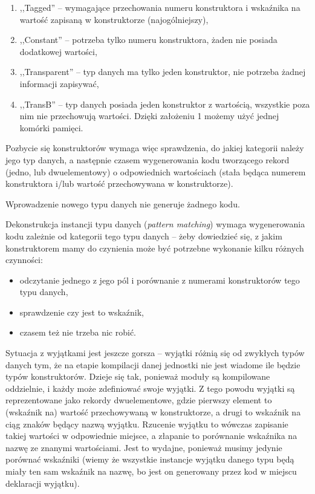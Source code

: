 \documentclass[11pt]{scrartcl}
\begin{document}
\begin{enumerate}
\item ,,Tagged'' -- wymagające przechowania numeru konstruktora i wskaźnika na
  wartość zapisaną w konstruktorze (najogólniejszy),
\item ,,Constant'' -- potrzeba tylko numeru konstruktora, żaden nie posiada
  dodatkowej wartości,
\item ,,Transparent'' -- typ danych ma tylko jeden konstruktor, nie potrzeba żadnej
  informacji zapisywać,
\item ,,TransB'' -- typ danych posiada jeden konstruktor z wartością, wszystkie
  poza nim nie przechowują wartości. Dzięki założeniu 1 możemy użyć jednej komórki
  pamięci.
\end{enumerate}

Pozbycie się konstruktorów wymaga więc sprawdzenia, do jakiej kategorii należy
jego typ danych, a następnie czasem wygenerowania kodu tworzącego rekord (jedno, lub
dwuelementowy) o odpowiednich wartościach (stała będąca numerem konstruktora
i/lub wartość przechowywana w konstruktorze).

Wprowadzenie nowego typu danych nie generuje żadnego kodu.

Dekonstrukcja instancji typu danych (\textit{pattern matching}) wymaga wygenerowania kodu
zależnie od kategorii tego typu danych -- żeby dowiedzieć się, z jakim
konstruktorem mamy do czynienia może być potrzebne wykonanie kilku różnych
czynności:
\begin{itemize}
\item odczytanie jednego z jego pól i porównanie z numerami konstruktorów tego
  typu danych,
\item sprawdzenie czy jest to wskaźnik,
\item czasem też nie trzeba nic robić.
\end{itemize}

Sytuacja z wyjątkami jest jeszcze gorsza -- wyjątki różnią się od zwykłych
typów danych tym, że na etapie kompilacji danej jednostki nie jest wiadome ile
będzie typów
konstruktorów. Dzieje się tak, ponieważ moduły są kompilowane oddzielnie, i
każdy może zdefiniować swoje wyjątki. Z tego powodu wyjątki są reprezentowane
jako rekordy dwuelementowe, gdzie pierwszy element to (wskaźnik na) wartość
przechowywaną w konstruktorze, a drugi to wskaźnik na ciąg znaków będący nazwą
wyjątku. Rzucenie wyjątku to wówczas zapisanie takiej wartości w odpowiednie
miejsce, a złapanie to porównanie wskaźnika na nazwę ze znanymi wartościami.
Jest to wydajne, ponieważ musimy jedynie porównać wskaźniki (wiemy że wszystkie
instancje wyjątku danego typu będą miały ten sam wskaźnik na nazwę, bo jest on
generowany przez kod w miejscu deklaracji wyjątku).
\end{document}

